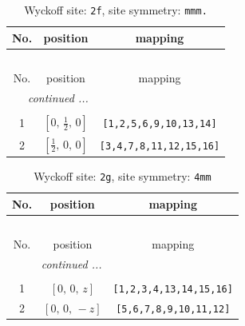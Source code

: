 \documentclass[fleqn,8pt]{jsarticle}
\begin{document}
\renewcommand{\arraystretch}{1.2}
\begin{longtable}{ccc}
\caption{Wyckoff site: {\tt 2f}, site symmetry: {\tt mmm.}}
 \\
 \hline \hline
No. & position & mapping \\ \hline \endfirsthead

\multicolumn{2}{l}{\tablename\ \thetable{}} \\
 \hline \hline
No. & position & mapping \\ \hline \endhead

 \hline \hline
\multicolumn{2}{r}{\footnotesize\it continued ...} \\ \endfoot

 \hline \hline
\multicolumn{2}{r}{} \\ \endlastfoot

1 & $\left[ 0,\, \frac{1}{2},\, 0 \right]$ & {\tt [1,2,5,6,9,10,13,14]} \\ \hline
2 & $\left[ \frac{1}{2},\, 0,\, 0 \right]$ & {\tt [3,4,7,8,11,12,15,16]} \\
\end{longtable}
\renewcommand{\arraystretch}{1.2}
\begin{longtable}{ccc}
\caption{Wyckoff site: {\tt 2g}, site symmetry: {\tt 4mm}}
 \\
 \hline \hline
No. & position & mapping \\ \hline \endfirsthead

\multicolumn{2}{l}{\tablename\ \thetable{}} \\
 \hline \hline
No. & position & mapping \\ \hline \endhead

 \hline \hline
\multicolumn{2}{r}{\footnotesize\it continued ...} \\ \endfoot

 \hline \hline
\multicolumn{2}{r}{} \\ \endlastfoot

1 & $\left[ 0,\, 0,\, z \right]$ & {\tt [1,2,3,4,13,14,15,16]} \\ \hline
2 & $\left[ 0,\, 0,\, - z \right]$ & {\tt [5,6,7,8,9,10,11,12]} \\
\end{longtable}
\renewcommand{\arraystretch}{1.2}
\end{document}
